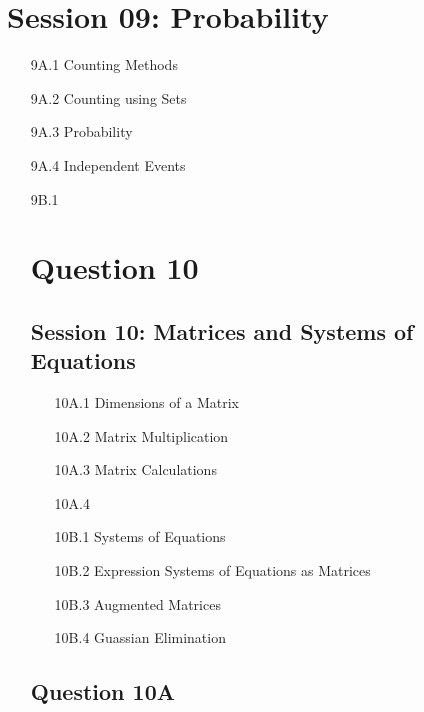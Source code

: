 \documentclass[]{report}
\begin{document}
\section*{Session 09: Probability}
\begin{itemize}
\item[9A.1] Counting Methods
\item[9A.2] Counting using Sets
\item[9A.3] Probability
\item[9A.4] Independent Events
\end{itemize}
\begin{itemize}
\item[9B.1] 












\section*{Question 10}

\subsection*{Session 10: Matrices and Systems of Equations}
\begin{itemize}
\item[10A.1] Dimensions of a Matrix
\item[10A.2] Matrix Multiplication
\item[10A.3] Matrix Calculations
\item[10A.4] 
\end{itemize}

\begin{itemize}
\item[10B.1] Systems of Equations
\item[10B.2] Expression Systems of Equations as Matrices
\item[10B.3] Augmented Matrices
\item[10B.4] Guassian Elimination
\end{itemize}
\subsection*{Question 10A}


\end{itemize}
\end{document}
